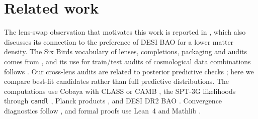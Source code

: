 \section{Related work}
\label{sec:related-work}

The lens-swap observation that motivates this work is reported in \cite{arxiv2601_16277}, which also discusses its connection to the preference of DESI BAO for a lower matter density. The Six Birds vocabulary of lenses, completions, packaging and audits comes from \cite{sixbirds_foundations}, and its use for train/test audits of cosmological data combinations follows \cite{sixbirds_darkenergy}. Our cross-lens audits are related to posterior predictive checks \cite{gelman_meng_stern1996_ppc}; here we compare best-fit candidates rather than full predictive distributions. The computations use Cobaya \cite{cobaya} with CLASS \cite{class} or CAMB \cite{camb}, the SPT-3G likelihoods through \texttt{candl} \cite{candl,spt3g2018_ttteee,spt3g_d1}, Planck products \cite{planck2018_cosmoparams,planck2018_likelihood,planck_pr4_lensing}, and DESI DR2 BAO \cite{desi_dr2_bao_docs,bao_data_v26,desi_dr2_results_ii_bao}. Convergence diagnostics follow \cite{gelman_rubin1992,vehtari2021_rhat}, and formal proofs use Lean~4 and Mathlib \cite{lean4,mathlib}.

